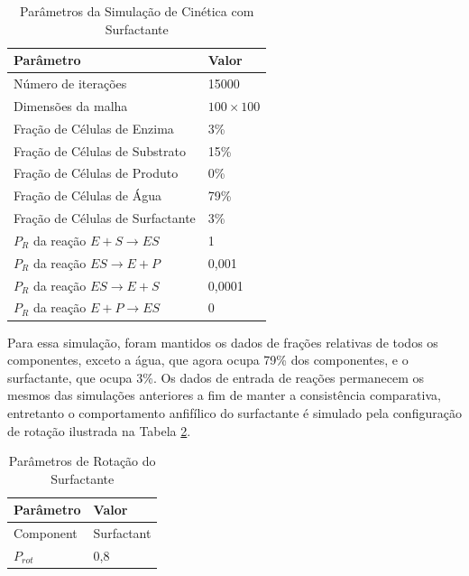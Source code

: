 \documentclass[12pt,oneside]{report}
\begin{document}
\begin{table}[H]
    \centering
    \caption{Parâmetros da Simulação de Cinética com Surfactante}
    \vspace{0.2cm}
    \begin{tabularx}{\textwidth}{X m{5cm}}
        \hline
        \textbf{Parâmetro}                     & \textbf{Valor}   \\
        \hline
        Número de iterações                    & 15000            \\
        Dimensões da malha                     & $100 \times 100$ \\
        Fração de Células de Enzima            & 3\%              \\
        Fração de Células de Substrato         & 15\%             \\
        Fração de Células de Produto           & 0\%              \\
        Fração de Células de Água              & 79\%             \\
        Fração de Células de Surfactante       & 3\%              \\
        $P_R$ da reação $E + S \rightarrow ES$ & 1                \\
        $P_R$ da reação $ES \rightarrow E + P$ & 0{,}001          \\
        $P_R$ da reação $ES \rightarrow E + S$ & 0{,}0001         \\
        $P_R$ da reação $E + P \rightarrow ES$ & 0                \\
        \hline
    \end{tabularx}
    \vspace{0.2cm}
    \label{tab:params_apolar_surfactante}
\end{table}

Para essa simulação, foram mantidos os dados de frações relativas de todos os componentes, exceto a água, que agora ocupa 79\% dos componentes, e o surfactante, que ocupa 3\%. Os dados de entrada de reações permanecem os mesmos das simulações anteriores a fim de manter a consistência comparativa, entretanto o comportamento anfifílico do surfactante é simulado pela configuração de rotação ilustrada na Tabela \ref{tab:rotation_surfactant}.

\begin{table}[H]
    \centering
    \caption{Parâmetros de Rotação do Surfactante}
    \vspace{0.2cm}
    \begin{tabularx}{\textwidth}{X m{5cm}}
        \hline
        \textbf{Parâmetro} & \textbf{Valor} \\
        \hline
        Component          & Surfactant     \\
        $P_{rot}$          & 0{,}8          \\
        \hline
    \end{tabularx}
    \vspace{0.2cm}
    \label{tab:rotation_surfactant}
\end{table}
\end{document}
